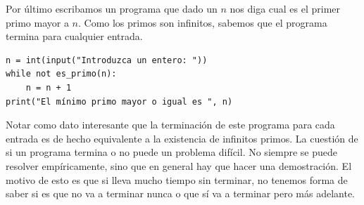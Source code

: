 \documentclass[a4paper, 12pt]{report}
\theoremstyle{definition}
\begin{document}
Por último escribamos un programa que dado un $n$ nos diga cual es el primer primo mayor a $n$. Como los primos son infinitos, sabemos que el programa termina para cualquier entrada.
\begin{verbatim}
n = int(input("Introduzca un entero: "))
while not es_primo(n):
    n = n + 1
print("El mínimo primo mayor o igual es ", n)
\end{verbatim}
Notar como dato interesante que la terminación de este programa para cada entrada es de hecho equivalente a la existencia de infinitos primos. La cuestión de si un programa termina o no puede un problema difícil. No siempre se puede resolver empíricamente, sino que en general hay que hacer una demostración. El motivo de esto es que si lleva mucho tiempo sin terminar, no tenemos forma de saber si es que no va a terminar nunca o que sí va a terminar pero más adelante.
\end{document}
